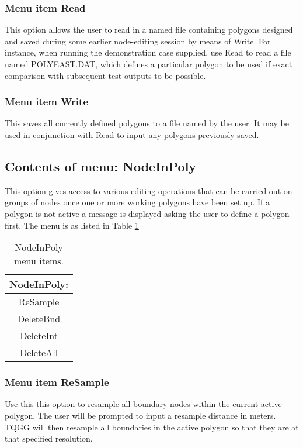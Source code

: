 \documentclass{article}
\begin{document}
\subsubsection[Menu item Read]{Menu item Read}
This option allows the user to read in a named file containing polygons designed and saved during some earlier node-editing session by means of Write. For instance, when running the demonstration case supplied, use Read to read a file named POLYEAST.DAT, which defines a particular polygon to be used if exact comparison with subsequent test outputs to be possible.

\subsubsection[Menu item Write]{Menu item Write}
This saves all currently defined polygons to a file named by the user. It may be used in conjunction with Read to input any polygons previously saved.

\subsection{Contents of menu: NodeInPoly}
This option gives access to various editing operations that can be carried out on groups of nodes once one or more working polygons have been set up. 
If a polygon is not active a message is displayed asking the user to define a polygon first.
The menu is as listed in Table \ref{tab:NODEINPOLY} 

\begin{table}[htb!]
 \caption{NodeInPoly menu items.}
  \begin{center}
   \begin{tabular}{|c|}
    \hline
NodeInPoly:\\     \hline
ReSample \\ DeleteBnd \\ DeleteInt \\ DeleteAll \\
    \hline
   \end{tabular}
   \label{tab:NODEINPOLY}
  \end{center}
\end{table}

\subsubsection[Menu item ReSample]{Menu item ReSample}
Use this this option to resample all boundary nodes within the current active polygon. The user will be prompted to input a resample distance in meters. TQGG will then resample all boundaries in the active polygon so that they are at that specified resolution.
\end{document}
